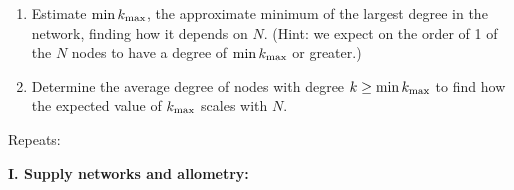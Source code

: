 \begin{enumerate}
    \begin{enumerate}
    \item Estimate $\min k_{\rm max}$, the approximate minimum of 
      the largest degree in the network, 
      finding how it depends on $N$.  (Hint: we expect on
      the order of 1 of the $N$ nodes to have a degree
      of $\min k_{\rm max}$ or greater.)

      
   \solutionstart


   \solutionend

    \item Determine the average degree of nodes with degree
      $k \ge \min k_{\rm max}$ to find how the expected
      value of $k_{\rm max}$ scales with $N$.

      
   \solutionstart


   \solutionend

    \end{enumerate}



  \end{enumerate}

  







  









Repeats:

\textbf{I. Supply networks and allometry:}


